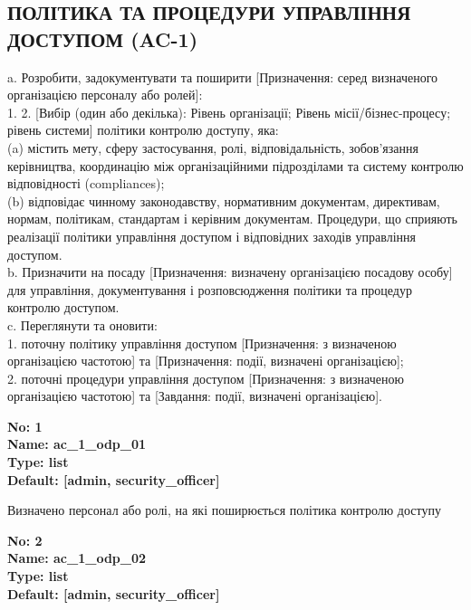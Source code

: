 \documentclass{article}
\begin{document}
\subsection{ПОЛІТИКА ТА ПРОЦЕДУРИ УПРАВЛІННЯ ДОСТУПОМ (AC-1)}
a. Розробити, задокументувати та поширити [Призначення: серед визначеного організацією персоналу або ролей]:\\ 
1. 2. [Вибір (один або декілька): Рівень організації; Рівень місії/бізнес-процесу; рівень системи] політики контролю доступу, яка:\\ 
(a) містить мету, сферу застосування, ролі, відповідальність, зобов'язання керівництва, координацію між організаційними підрозділами та систему контролю відповідності (compliances);\\ 
(b) відповідає чинному законодавству, нормативним документам, директивам, нормам, політикам, стандартам і керівним документам. Процедури, що сприяють реалізації політики управління доступом і відповідних заходів управління доступом.\\ 
b. Призначити на посаду [Призначення: визначену організацією посадову особу] для управління, документування і розповсюдження політики та процедур контролю доступом.\\ 
c. Переглянути та оновити:\\ 
1. поточну політику управління доступом [Призначення: з визначеною організацією частотою] та [Призначення: події, визначені організацією];\\ 
2. поточні процедури управління доступом [Призначення: з визначеною організацією частотою] та [Завдання: події, визначені організацією].

\vspace{10pt}
{\footnotesize\bfseries
No: 1\\
Name: ac\_\allowbreak{}1\_\allowbreak{}odp\_\allowbreak{}01\\
Type: list\\
Default: [\textquotedbl{}admin\textquotedbl{}, \textquotedbl{}security\_\allowbreak{}officer\textquotedbl{}]
}

{\footnotesize Визначено персонал або ролі, на які поширюється політика контролю доступу}


{\footnotesize\bfseries
No: 2\\
Name: ac\_\allowbreak{}1\_\allowbreak{}odp\_\allowbreak{}02\\
Type: list\\
Default: [\textquotedbl{}admin\textquotedbl{}, \textquotedbl{}security\_\allowbreak{}officer\textquotedbl{}]
}
\end{document}
